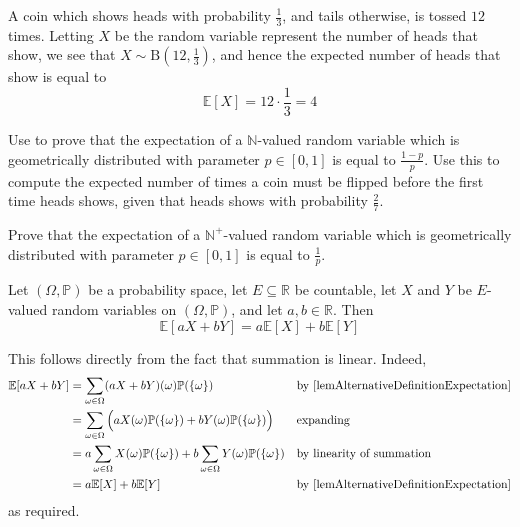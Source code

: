 \begin{example}
A coin which shows heads with probability $\frac{1}{3}$, and tails otherwise, is tossed $12$ times. Letting $X$ be the random variable represent the number of heads that show, we see that $X \sim \mathrm{B}(12,\frac{1}{3})$, and hence the expected number of heads that show is equal to
\[ \mathbb{E}[X] = 12 \cdot \frac{1}{3} = 4 \]
\end{example}

\begin{exercise}
\label{exExpectationOfGeometric}
Use  to prove that the expectation of a $\mathbb{N}$-valued random variable which is geometrically distributed with parameter $p \in [0,1]$ is equal to $\frac{1-p}{p}$. Use this to compute the expected number of times a coin must be flipped before the first time heads shows, given that heads shows with probability $\frac{2}{7}$.
\end{exercise}

\begin{exercise}
\label{exExpectationOfGeometricPositive}
Prove that the expectation of a $\mathbb{N}^+$-valued random variable which is geometrically distributed with parameter $p \in [0,1]$ is equal to $\frac{1}{p}$.
\end{exercise}

\begin{theorem}
\label{thmLinearityOfExpectation}
Let $(\Omega,\mathbb{P})$ be a probability space, let $E \subseteq \mathbb{R}$ be countable, let $X$ and $Y$ be $E$-valued random variables on $(\Omega,\mathbb{P})$, and let $a,b \in \mathbb{R}$. Then
\[ \mathbb{E}[aX+bY] = a\mathbb{E}[X] + b\mathbb{E}[Y] \]
\end{theorem}

\begin{cproof}
This follows directly from the fact that summation is linear. Indeed,
\begin{align*}
\mathbb{E}[aX+bY] &= \sum_{\omega \in \Omega} (aX+bY)(\omega) \mathbb{P}(\{\omega\}) && \text{by \Cref{lemAlternativeDefinitionExpectation}} \\
&= \sum_{\omega \in \Omega} \Big( aX(\omega)\mathbb{P}(\{\omega\}) + bY(\omega)\mathbb{P}(\{\omega\}) \Big) && \text{expanding} \\
&= a \sum_{\omega \in \Omega} X(\omega)\mathbb{P}(\{\omega\}) + b \sum_{\omega \in \Omega} Y(\omega)\mathbb{P}(\{\omega\}) && \text{by linearity of summation} \\
&= a\mathbb{E}[X] + b\mathbb{E}[Y] && \text{by \Cref{lemAlternativeDefinitionExpectation}}
\end{align*}
as required.
\end{cproof}

